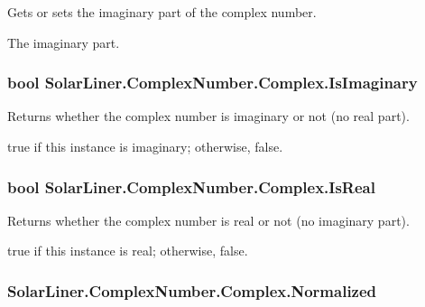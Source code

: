 Gets or sets the imaginary part of the complex number. 

The imaginary part.
\subsubsection[{\texorpdfstring{Is\+Imaginary}{IsImaginary}}]{\setlength{\rightskip}{0pt plus 5cm}bool Solar\+Liner.\+Complex\+Number.\+Complex.\+Is\+Imaginary\hspace{0.3cm}{\ttfamily [get]}}\hypertarget{struct_solar_liner_1_1_complex_number_1_1_complex_a6d8e0e3f6ef11495a52ca1e242dd2b81}{}\label{struct_solar_liner_1_1_complex_number_1_1_complex_a6d8e0e3f6ef11495a52ca1e242dd2b81}


Returns whether the complex number is imaginary or not (no real part). 

{\ttfamily true} if this instance is imaginary; otherwise, {\ttfamily false}.
\subsubsection[{\texorpdfstring{Is\+Real}{IsReal}}]{\setlength{\rightskip}{0pt plus 5cm}bool Solar\+Liner.\+Complex\+Number.\+Complex.\+Is\+Real\hspace{0.3cm}{\ttfamily [get]}}\hypertarget{struct_solar_liner_1_1_complex_number_1_1_complex_aea768996f77db530fbf4eeedb5395d1d}{}\label{struct_solar_liner_1_1_complex_number_1_1_complex_aea768996f77db530fbf4eeedb5395d1d}


Returns whether the complex number is real or not (no imaginary part). 

{\ttfamily true} if this instance is real; otherwise, {\ttfamily false}.
\subsubsection[{\texorpdfstring{Normalized}{Normalized}}]{ Solar\+Liner.\+Complex\+Number.\+Complex.\+Normalized\hspace{0.3cm}{\ttfamily [get]}}\hypertarget{struct_solar_liner_1_1_complex_number_1_1_complex_a1aee91d60a830dd7c455e85a3976b622}{}\label{struct_solar_liner_1_1_complex_number_1_1_complex_a1aee91d60a830dd7c455e85a3976b622}


